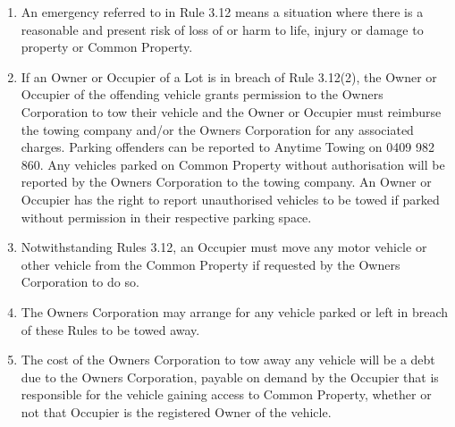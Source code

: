 \documentclass{article}
\begin{document}
\begin{enumerate}[label=\arabic*.]
\begin{enumerate}[label=\arabic{enumi}.\arabic*.]
\begin{enumerate}[label=(\arabic*)]
\begin{enumerate}[label=(\arabic*)]
\begin{enumerate}[label=(\alph*)]
\item  on Common Property;

\item  on an area designated for visitor parking;

\item  on a Lot not owned by the Occupier or which the Occupier is entitled to use;

\item  in parking spaces situated on Common Property and allocated for other Lots;

\item  on the Common Property so as to obstruct a driveway, pathway, entrance or exit to a Lot; or

\item  in any place, other than a parking area situated on Common Property specified for that purposed by the Owners Corporation.

\end{enumerate}

\item  An emergency referred to in Rule 3.12 means a situation where there is a reasonable and present risk of loss of or harm to life, injury or damage to property or Common Property.

\item  If an Owner or Occupier of a Lot is in breach of Rule 3.12(2), the Owner or Occupier of the offending vehicle grants permission to the Owners Corporation to tow their vehicle and the Owner or Occupier must reimburse the towing company and/or the Owners Corporation for any associated charges. Parking offenders can be reported to Anytime Towing on 0409 982 860. Any vehicles parked on Common Property without authorisation will be reported by the Owners Corporation to the towing company. An Owner or Occupier has the right to report unauthorised vehicles to be towed if parked without permission in their respective parking space.

\item  Notwithstanding Rules 3.12, an Occupier must move any motor vehicle or other vehicle from the Common Property if requested by the Owners Corporation to do so.

\item  The Owners Corporation may arrange for any vehicle parked or left in breach of these Rules to be towed away.
\newpage



\item  The cost of the Owners Corporation to tow away any vehicle will be a debt due to the Owners Corporation, payable on demand by the Occupier that is responsible for the vehicle gaining access to Common Property, whether or not that Occupier is the registered Owner of the vehicle.


\end{enumerate}
\end{enumerate}
\end{enumerate}
\end{enumerate}
\end{document}
